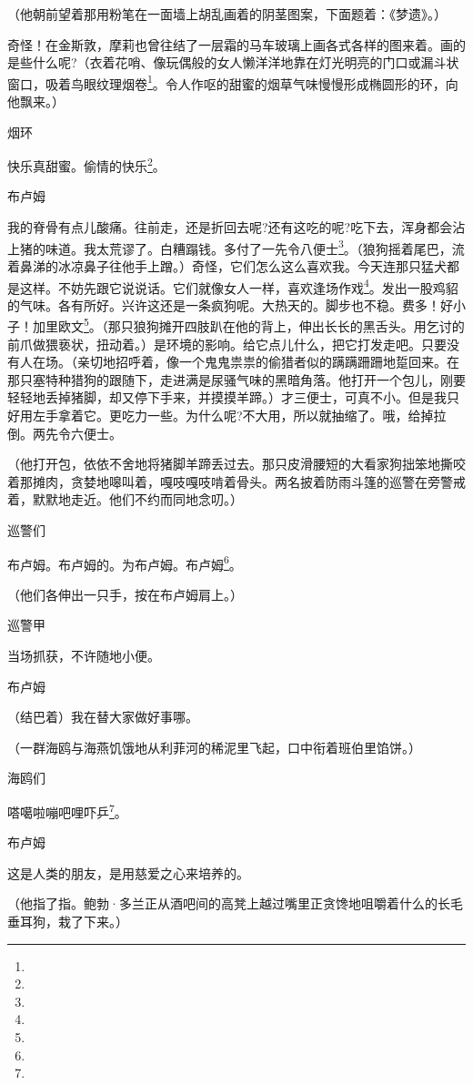 \par （他朝前望着那用粉笔在一面墙上胡乱画着的阴茎图案，下面题着：《梦遗》。）
\par 奇怪！在金斯敦，摩莉也曾往结了一层霜的马车玻璃上画各式各样的图来着。画的是些什么呢?（衣着花哨、像玩偶般的女人懒洋洋地靠在灯光明亮的门口或漏斗状窗口，吸着鸟眼纹理烟卷\footnote{}。令人作呕的甜蜜的烟草气味慢慢形成椭圆形的环，向他飘来。）
\par 烟环
\par 快乐真甜蜜。偷情的快乐\footnote{}。
\par 布卢姆
\par 我的脊骨有点儿酸痛。往前走，还是折回去呢?还有这吃的呢?吃下去，浑身都会沾上猪的味道。我太荒谬了。白糟蹋钱。多付了一先令八便士\footnote{}。（狼狗摇着尾巴，流着鼻涕的冰凉鼻子往他手上蹭。）奇怪，它们怎么这么喜欢我。今天连那只猛犬都是这样。不妨先跟它说说话。它们就像女人一样，喜欢逢场作戏\footnote{}。发出一股鸡貂的气味。各有所好。兴许这还是一条疯狗呢。大热天的。脚步也不稳。费多！好小子！加里欧文\footnote{}。（那只狼狗摊开四肢趴在他的背上，伸出长长的黑舌头。用乞讨的前爪做猥亵状，扭动着。）是环境的影响。给它点儿什么，把它打发走吧。只要没有人在场。（亲切地招呼着，像一个鬼鬼祟祟的偷猎者似的蹒蹒跚跚地踅回来。在那只塞特种猎狗的跟随下，走进满是尿骚气味的黑暗角落。他打开一个包儿，刚要轻轻地丢掉猪脚，却又停下手来，并摸摸羊蹄。）才三便士，可真不小。但是我只好用左手拿着它。更吃力一些。为什么呢?不大用，所以就抽缩了。哦，给掉拉倒。两先令六便士。
\par （他打开包，依依不舍地将猪脚羊蹄丢过去。那只皮滑腰短的大看家狗拙笨地撕咬着那摊肉，贪婪地嗥叫着，嘎吱嘎吱啃着骨头。两名披着防雨斗篷的巡警在旁警戒着，默默地走近。他们不约而同地念叨。）
\par 巡警们
\par 布卢姆。布卢姆的。为布卢姆。布卢姆\footnote{}。
\par （他们各伸出一只手，按在布卢姆肩上。）
\par 巡警甲
\par 当场抓获，不许随地小便。
\par 布卢姆
\par （结巴着）我在替大家做好事哪。
\par （一群海鸥与海燕饥饿地从利菲河的稀泥里飞起，口中衔着班伯里馅饼。）
\par 海鸥们
\par 嗒噶啦嘣吧哩吓乒\footnote{}。
\par 布卢姆
\par 这是人类的朋友，是用慈爱之心来培养的。
\par （他指了指。鲍勃·多兰正从酒吧间的高凳上越过嘴里正贪馋地咀嚼着什么的长毛垂耳狗，栽了下来。）
